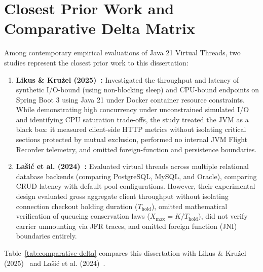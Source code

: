\section{Closest Prior Work and Comparative Delta Matrix}
\label{sec:closest-work}

Among contemporary empirical evaluations of Java 21 Virtual Threads, two studies represent the closest prior work to this dissertation:
\begin{enumerate}
  \item \textbf{Likus \& Krużel (2025)~\cite{Likus2025}:} Investigated the throughput and latency of synthetic I/O-bound (using non-blocking sleep) and CPU-bound endpoints on Spring Boot 3 using Java 21 under Docker container resource constraints. While demonstrating high concurrency under unconstrained simulated I/O and identifying CPU saturation trade-offs, the study treated the JVM as a black box: it measured client-side HTTP metrics without isolating critical sections protected by mutual exclusion, performed no internal JVM Flight Recorder telemetry, and omitted foreign-function and persistence boundaries.
  \item \textbf{Lašić et al. (2024)~\cite{Lasic2024}:} Evaluated virtual threads across multiple relational database backends (comparing PostgreSQL, MySQL, and Oracle), comparing CRUD latency with default pool configurations. However, their experimental design evaluated gross aggregate client throughput without isolating connection checkout holding duration ($T_{\text{hold}}$), omitted mathematical verification of queueing conservation laws ($X_{\text{max}} = K / T_{\text{hold}}$), did not verify carrier unmounting via JFR traces, and omitted foreign function (JNI) boundaries entirely.
\end{enumerate}

Table~\ref{tab:comparative-delta} compares this dissertation with Likus \& Krużel (2025)~\cite{Likus2025} and Lašić et al. (2024)~\cite{Lasic2024}.

